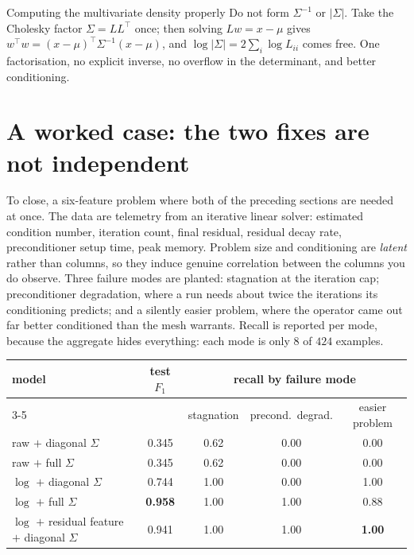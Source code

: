 \documentclass[11pt,a4paper]{article}
\begin{document}
\begin{keybox}{Computing the multivariate density properly}
Do not form $\Sigma^{-1}$ or $|\Sigma|$. Take the Cholesky factor
$\Sigma = LL^{\!\top}$ once; then solving $Lw = x-\mu$ gives
$w^{\!\top}w = (x-\mu)^{\!\top}\Sigma^{-1}(x-\mu)$, and
$\log|\Sigma| = 2\sum_i \log L_{ii}$ comes free. One factorisation, no
explicit inverse, no overflow in the determinant, and better conditioning.
\end{keybox}

\section{A worked case: the two fixes are not independent}

To close, a six-feature problem where both of the preceding sections are
needed at once. The data are telemetry from an iterative linear solver:
estimated condition number, iteration count, final residual, residual decay
rate, preconditioner setup time, peak memory. Problem size and conditioning
are \emph{latent} rather than columns, so they induce genuine correlation
between the columns you do observe. Three failure modes are planted:
stagnation at the iteration cap; preconditioner degradation, where a run needs
about twice the iterations its conditioning predicts; and a silently easier
problem, where the operator came out far better conditioned than the mesh
warrants. Recall is reported per mode, because the aggregate hides everything:
each mode is only $8$ of $424$ examples.

\begin{center}\small
\begin{tabular}{@{}lcccc@{}}
\toprule
model & test $F_1$ & \multicolumn{3}{c}{recall by failure mode} \\
\cmidrule(l){3-5}
 & & stagnation & precond.\ degrad. & easier problem \\
\midrule
raw $+$ diagonal $\Sigma$            & 0.345 & 0.62 & 0.00 & 0.00 \\
raw $+$ full $\Sigma$                & 0.345 & 0.62 & 0.00 & 0.00 \\
$\log$ $+$ diagonal $\Sigma$         & 0.744 & 1.00 & 0.00 & 1.00 \\
$\log$ $+$ full $\Sigma$             & \textbf{0.958} & 1.00 & 1.00 & 0.88 \\
$\log$ $+$ residual feature $+$ diagonal $\Sigma$ & 0.941 & 1.00 & 1.00 & \textbf{1.00} \\
\bottomrule
\end{tabular}
\end{center}
\end{document}
